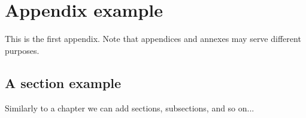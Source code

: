 \chapter{Appendix example}
\label{ap1}

This is the first appendix.
Note that appendices and annexes may serve different purposes.


\section{A section example}
\label{ap1:s:a-section-example}

Similarly to a chapter we can add sections, subsections, and so on...
